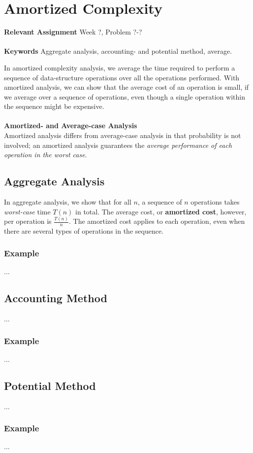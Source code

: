 
\chapter{Amortized Complexity}
\label{ch:amortizedcomplexity}

\textbf{Relevant Assignment} Week ?, Problem ?-?\\\\
\textbf{Keywords} Aggregate analysis, accounting- and potential method, average.
\vspace{1in}

\noindent In amortized complexity analysis, we average the time required to
perform a sequence of data-structure operations over all the operations
performed. With amortized analysis, we can show that the average cost of an
operation is small, if we average over a sequence of operations, even though
a single operation within the sequence might be expensive.
\\\\
\noindent \textbf{Amortized- and Average-case Analysis} \\
Amortized analysis differs from average-case analysis in that probability is
not involved; an amortized analysis guarantees the \textit{average performance
of each operation in the worst case}.

\newpage
\section{Aggregate Analysis}
In aggregate analysis, we show that for all $n$, a sequence of $n$ operations
takes \textit{worst-case} time $T(n)$ in total. The average cost, or \textbf{
amortized cost}, however, per operation is $\frac{T(n)}{n}$. The amortized
cost applies to each operation, even when there are several types of
operations in the sequence.

\subsection{Example}
...

\section{Accounting Method}
...

\subsection{Example}
...

\section{Potential Method}
...

\subsection{Example}
...

